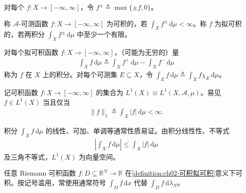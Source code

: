 \documentclass[../../main.tex]{subfiles}%
\begin{document}
对每个 $f:X\to[-\infty,\infty]$，令 $f^\pm\triangleq \max\{\pm f,0\}$。

\begin{definition}\label{definition:ch02-可积拟可积}
称 $\mathscr A$-可测函数 $f:X\to[-\infty,\infty]$ 为可积的，若 $\int_X f^\pm\,\mathrm{d}\mu<\infty$。称 $f$ 为拟可积的，若两积分 $\int_X f^\pm\,\mathrm{d}\mu$ 中至少一个有限。
\end{definition}

对每个拟可积函数 $f:X\to[-\infty,\infty]$，（可能为无穷的）量
\begin{align*}
\int_X f\,\mathrm{d}\mu\triangleq \int_X f^+\,\mathrm{d}\mu-\int_X f^-\,\mathrm{d}\mu
\end{align*}
称为 $f$ 在 $X$ 上的积分。对每个可测集 $E\subseteq X$，令 $\int_E f\,\mathrm{d}\mu\triangleq \int_X f\chi_E\,\mathrm{d}\mu$。

记可积函数 $f:X\to[-\infty,\infty]$ 的集合为 $L^1(X)\equiv L^1(X,\mathscr A,\mu)$。易见 $f\in L^1(X)$ 当且仅当
\begin{align*}
\|f\|_1\triangleq \int_X|f|\,\mathrm{d}\mu<\infty.
\end{align*}

积分 $\int_X f\,\mathrm{d}\mu$ 的线性、可加、单调等通常性质易证。由积分线性性、不等式
\begin{align*}
\left|\int_X f\,\mathrm{d}\mu\right|\leqslant\int_X|f|\,\mathrm{d}\mu
\end{align*}
及三角不等式，$L^1(X)$ 为向量空间。

\begin{remark}\label{remark:ch02-Riemann可积}
任意 Riemann 可积函数 $f:D\subseteq\mathbb R^N\to\mathbb R$ 在\cref{definition:ch02-可积拟可积}意义下可积。按记号滥用，常使用通常符号 $\int_D f\,\mathrm{d}x$ 代替 $\int_D f\,\mathrm{d}\lambda_N$。
\end{remark}
\end{document}
